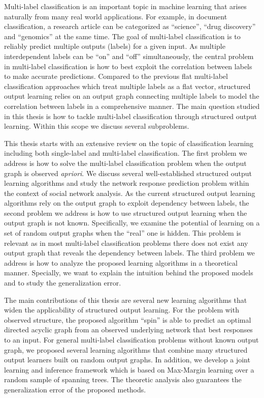 \documentclass[10pt]{article}
\begin{document}
\setlength{\parindent}{3mm}
\small

\noindent Multi-label classification is an important topic in machine learning that arises naturally from many real world applications. For example, in document classification, a research article can be categorized as ``science'', ``drug discovery'' and ``genomics'' at the same time. The goal of multi-label classification is to reliably predict multiple outputs (labels) for a given input. As multiple interdependent labels can be ``on'' and ``off'' simultaneously, the central problem in multi-label classification is how to best exploit the correlation between labels to make accurate predictions. Compared to the previous flat multi-label classification approaches which treat multiple labels as a flat vector, structured output learning relies on an output graph connecting multiple labels to model the correlation between labels in a comprehensive manner. The main question studied in this thesis is how to tackle multi-label classification through structured output learning. Within this scope we discuss several subproblems.

This thesis starts with an extensive review on the topic of classification learning including both single-label and multi-label classification. The first problem we address is how to solve the multi-label classification problem when the output graph is observed \textit{apriori}. We discuss several well-established structured output learning algorithms and study the network response prediction problem within the context of social network analysis. As the current structured output learning algorithms rely on the output graph to exploit dependency between labels, the second problem we address is how to use structured output learning when the output graph is not known. Specifically, we examine the potential of learning on a set of random output graphs when the ``real'' one is hidden. This problem is relevant as in most multi-label classification problems there does not exist any output graph that reveals the dependency between labels. The third problem we address is how to analyze the proposed learning algorithms in a theoretical manner. Specially, we want to explain the intuition behind the proposed models and to study the generalization error.

The main contributions of this thesis are several new learning algorithms that widen the applicability of structured output learning. For the problem with observed structure, the proposed algorithm ``{\sc spin}'' is able to predict an optimal directed acyclic graph from an observed underlying network that best responses to an input. For general multi-label classification problems without known output graph, we proposed several learning algorithms that combine many structured output learners built on random output graphs. In addition, we develop a joint learning and inference framework which is based on Max-Margin learning over a random sample of spanning trees. The theoretic analysis also guarantees the generalization error of the proposed methods.
\end{document}
